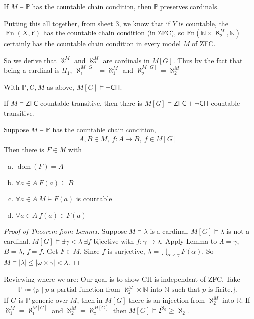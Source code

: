 \documentclass{article}
\newcommand{\p}{\mathbb{P}}
\newcommand{\1}{\mathbbm{1}}
\DeclareMathOperator{\dom}{dom}
\let\models\vDash
\begin{document}
\begin{thm}
  If $M \models \p$ has the countable chain condition, then $\p$ preserves cardinals.
\end{thm}

Putting this all together, from sheet 3, we know that if $Y$ is countable, the $\operatorname{Fn}(X,Y)$ has the countable chain condition (in \textsf{ZFC}), so $\text{Fn}(\mathbb{N} \times \aleph_2^M, \mathbb{N})$ certainly has the countable chain condition in every model $M$ of \textsf{ZFC}.

So we derive that $\aleph_1^M$ and $\aleph_2^M$ are cardinals in $M[G]$.
Thus by the fact that being a cardinal is $\Pi_1$, $\aleph_1^{M[G]} = \aleph_1^M$ and $\aleph_2^{M[G]} = \aleph_2^M$

\begin{cor}
  With $\p ,G,M$ as above, $M[G] \models \neg \textsf{CH}$.
\end{cor}
\begin{cor}
  If $M \models \textsf{ZFC}$ countable transitive, then there is $M[G] \models \textsf{ZFC} + \neg \textsf{CH}$ countable transitive.
\end{cor}
\begin{lemma}
  Suppose $M \models \p$ has the countable chain condition,
  \begin{align*}
    A,B \in M,\ f: A \to B, \ f \in M[G]
  \end{align*}
  Then there is $F \in M$ with
  \begin{enumerate}[(a)]
    \item $\dom(F) = A$
    \item $\forall a \in A \ F(a) \subseteq B$
    \item $\forall a \in A \ M \models F(a)$ is countable
    \item $\forall a \in A \ f(a) \in F(a)$
  \end{enumerate}
\end{lemma}
\begin{proof}[Proof of Theorem from Lemma]
  Suppose $M \models \lambda$ is a cardinal, $M[G] \models \lambda$ is not a cardinal.
  $M[G] \models \exists \gamma < \lambda \ \exists f$ bijective with $f: \gamma \to \lambda$.
  Apply Lemma to $A = \gamma$, $B = \lambda$, $f = f$. Get $F \in M$. Since $f$ is surjective, $\lambda = \bigcup_{\alpha < \gamma} F(\alpha)$.
  So $M \models |\lambda| \leq |\omega \times \gamma| < \lambda$.
\end{proof}

\newlec
Reviewing where we are: Our goal is to show \textsf{CH} is independent of \textsf{ZFC}.
Take
\begin{align*}
  \mathbb{P} \coloneqq \{p \mid p \text{ a partial function from } \aleph_2^M \times \mathbb{N} \text{ into } \mathbb{N} \text{ such that } p \text{ is finite.}\}.
\end{align*}
If $G$ is $\p$-generic over $M$, then in $M[G]$ there is an injection from $\aleph_2^M$ into $\mathbb{R}$.
If $\aleph_1^M = \aleph_1^{M[G]}$ and $\aleph_2^M = \aleph_2^{M[G]}$ then $M[G] \models 2^{\aleph_0} \geq \aleph_2$.
\end{document}
